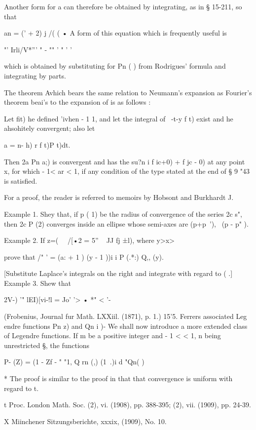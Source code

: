 {{{Another form for a can therefore be obtained by integrating, as in §
15-211, so that

an = (' + 2) j /( ( • A form of this equation which is frequently
useful is

"' Irli/V*''' " - "" ' " ' '

which is obtained by substituting for Pn ( ) from Rodrigues' formula
and integrating by parts.

The theorem Avhich bears the same relation to Neumann's expansion as
Fourier's theorem beai's to the expansion of is as follows :

Let fit) he defined 'ivhen - 1 1, and let the integral of \ -t-y f t)
exist and he ahsohitely convergent; also let

a = n- h) r f t)P t)dt.

Then 2a Pn a;) is convergent and has the su?n i f ic+0) + f jc - 0) at
any point x, for which - 1< ar < 1, if any condition of the type
stated at the end of § 9 "43 is satisfied.

For a proof, the reader is referred to memoirs by Hobsont and
Burkhardt J.

Example 1. Shey that, if p ( 1) be the radius of convergence of the
series 2c s", then 2c P (2) converges inside an ellipse whose
semi-axes are (p+p~'), \ (p - p" ).

Example 2. If z=( \ \ /[•2 = 5'' ~ JJ fj ±l), where y>x>\,

prove that /" ' = (a: + 1 ) (y - 1 ))i i P (.*:) Q,, (y).

[Substitute Laplace's integrals on the right and integrate with regard
to ( .] Example 3. Shew that

2V-) '" lEI)[vi-!l = Jo' '> • *" < '-

(Frobenius, Journal fur Math. LXXiil. (1871), p. 1.) 15'5. Ferrers
associated Leg endre functions Pn z) and Qn i )- We shall now
introduce a more extended class of Legendre functions. If m be a
positive integer and - 1 < < 1, n being unrestricted §, the functions

P- (Z) = (1 - Zf - " "1, Q rn (,) (1 \,.)i d "Qn( )

* The proof is similar to the proof in that that convergence is
uniform with regard to t.

t Proc. London Math. Soc. (2), vi. (1908), pp. 388-395; (2), vii.
(1909), pp. 24-39.

X Miinchener Sitzungsberichte, xxxix, (1909), No. 10.

}}}
